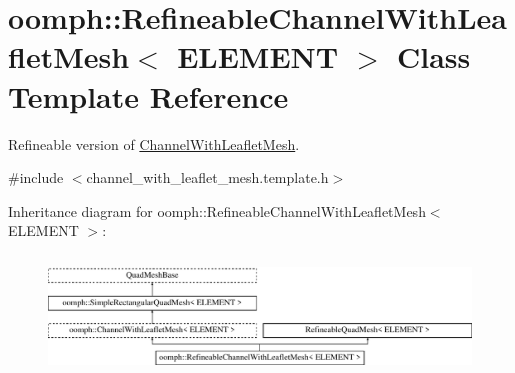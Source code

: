 \hypertarget{classoomph_1_1RefineableChannelWithLeafletMesh}{}\section{oomph\+:\+:Refineable\+Channel\+With\+Leaflet\+Mesh$<$ E\+L\+E\+M\+E\+NT $>$ Class Template Reference}
\label{classoomph_1_1RefineableChannelWithLeafletMesh}


Refineable version of \hyperlink{classoomph_1_1ChannelWithLeafletMesh}{Channel\+With\+Leaflet\+Mesh}.  




{\ttfamily \#include $<$channel\+\_\+with\+\_\+leaflet\+\_\+mesh.\+template.\+h$>$}

Inheritance diagram for oomph\+:\+:Refineable\+Channel\+With\+Leaflet\+Mesh$<$ E\+L\+E\+M\+E\+NT $>$\+:\begin{figure}[H]
\begin{center}
\leavevmode
\includegraphics[height=3.246377cm]{classoomph_1_1RefineableChannelWithLeafletMesh}
\end{center}
\end{figure}
